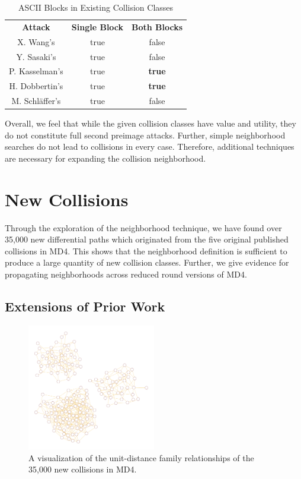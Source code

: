 \documentclass[conference]{IEEEtran}
\begin{document}
\begin{table}
    \caption{ASCII Blocks in Existing Collision Classes}
    \label{table:ascii}
    \begin{tabular}{c c c}
        \textbf{Attack} & \textbf{Single Block} & \textbf{Both Blocks} \\
        X. Wang's & true & false \\
        Y. Sasaki's & true & false \\
        P. Kasselman's & true & \textbf{true} \\
        H. Dobbertin's & true & \textbf{true} \\
        M. Schl{\"a}ffer's & true & false \\
    \end{tabular}
\end{table}

Overall, we feel that while the given collision classes have value and utility,
they do not constitute full second preimage attacks. Further, simple
neighborhood searches do not lead to collisions in every case. Therefore,
additional techniques are necessary for expanding the collision neighborhood.

\section{New Collisions} \label{Sec:Collision}

Through the exploration of the neighborhood technique, we have found over
35,000 new differential paths which originated from the five original published
collisions in MD4. This shows that the neighborhood definition is sufficient
to produce a large quantity of new collision classes. Further, we give
evidence for propagating neighborhoods across reduced round versions of MD4.

\subsection{Extensions of Prior Work}

\begin{figure}
\begin{center}
\includegraphics[width=0.5\textwidth]{Figs/families48.pdf}
\caption{A visualization of the unit-distance family relationships
of the 35,000 new collisions in MD4. }
\label{Fig:Families48}
\end{center}
\end{figure}
\end{document}
